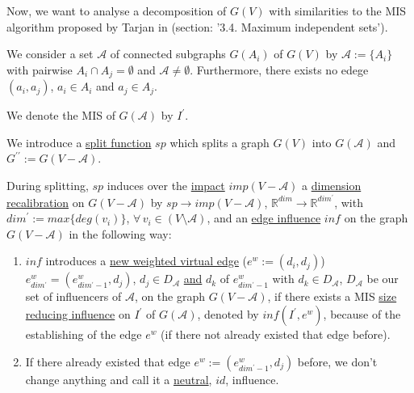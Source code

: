 \documentclass{article}
\newtheorem*{theorem A}{Theorem A}
\newtheorem*{theorem B}{N\"olker's Theorem}
\theoremstyle{remark}
\theoremstyle{remark}
\begin{document}
\vspace{0.3cm}
Now, we want to analyse a decomposition of $G\left(V\right)$ with similarities to the MIS algorithm proposed by Tarjan in \cite{tarjan1985decomposition} (section: '3.4. Maximum independent sets').

\vspace{0.3cm}
We consider a set $\mathcal{A}$ of connected subgraphs $G\left(A_{i}\right)$ of $G\left(V\right)$ by $\mathcal{A} := \{ A_{i} \}$ with pairwise $A_{i} \cap A_{j} = \emptyset$ and $\mathcal{A} \neq \emptyset$. Furthermore, there exists no edege $\left(a_{i}, a_{j}\right)$, $a_{i} \in A_{i}$ and $a_{j} \in A_{j}$.

\vspace{0.3cm}
We denote the MIS of $G\left(\mathcal{A}\right)$ by $I^{\prime}$.

\vspace{0.3cm}
We introduce a \underline{split function} $sp$ which splits a graph $G\left(V\right)$ into $G\left(\mathcal{A}\right)$ and $G^{\prime \prime} := G\left(V - \mathcal{A}\right)$.

\vspace{0.3cm}
During splitting, $sp$ induces over the \underline{impact} $imp\left(V - \mathcal{A}\right)$ a \underline{dimension recalibration} on $G\left(V - \mathcal{A}\right)$ by $sp \rightarrow imp\left(V - \mathcal{A}\right)$, $\mathbb{R}^{dim} \rightarrow \mathbb{R}^{dim^{\prime}}$, with $dim^{\prime} := max\{ deg\left(v_{i}\right) \}$, $\forall \, v_{i} \in \left(V  \setminus \mathcal{A}\right)$, and an \underline{edge influence} $inf$ on the graph $G\left(V - \mathcal{A}\right)$ in the following way:

\begin{enumerate}
    \item $inf$ introduces a \underline{new weighted virtual edge} ($e^{w} := \left(d_{i}, d_{j}\right)$) $e^{w}_{dim^{\prime}} = \left(e^{w}_{dim^{\prime} - 1}, d_{j}\right)$, $d_{j} \in D_{\mathcal{A}}$ \underline{and} $d_{k}$ of $e^{w}_{dim^{\prime} - 1}$ with $d_{k} \in D_{\mathcal{A}}$, $D_{\mathcal{A}}$ be our set of influencers of $\mathcal{A}$, on the graph $G\left(V - \mathcal{A}\right)$, if there exists a MIS \underline{size reducing influence} on $I^{\prime}$ of $G\left(\mathcal{A}\right)$, denoted by $inf\left(I^{\prime}, e^{w}\right)$, because of the establishing of the edge $e^{w}$ (if there not already existed that edge before).

    \item If there already existed that edge $e^{w} := \left(e^{w}_{dim^{\prime} - 1}, d_{j}\right)$ before, we don't change anything and call it a \underline{neutral}, $id$, influence.
\label{enum:newedge}
\end{enumerate}
\end{document}
